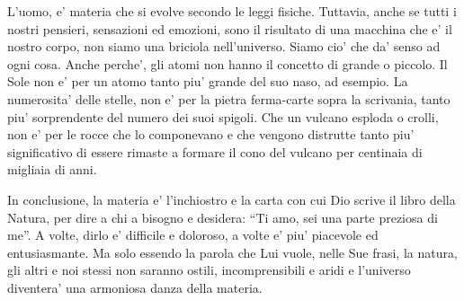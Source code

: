 L'uomo, e' materia che si evolve secondo le leggi fisiche. Tuttavia, anche se tutti i nostri pensieri, sensazioni ed emozioni, sono il risultato di una macchina che e' il nostro corpo, non siamo una briciola nell'universo. Siamo cio' che da' senso ad ogni cosa. Anche perche', gli atomi non hanno il concetto di grande o piccolo. Il Sole non e' per un atomo tanto piu' grande del suo naso, ad esempio. La numerosita' delle stelle, non e' per la pietra ferma-carte sopra la scrivania, tanto piu' sorprendente del numero dei suoi spigoli. Che un vulcano esploda o crolli, non e' per le rocce che lo componevano e che vengono distrutte tanto piu' significativo di essere rimaste a formare il cono del vulcano per centinaia di migliaia di anni.

In conclusione, la materia e' l'inchiostro e la carta con cui Dio scrive il libro della Natura, per dire a chi a bisogno e desidera: ``Ti amo, sei una parte preziosa di me''. A volte, dirlo e' difficile e doloroso, a volte e' piu' piacevole ed entusiasmante. Ma solo essendo la parola che Lui vuole, nelle Sue frasi, la natura, gli altri e noi stessi non saranno ostili, incomprensibili e aridi e l'universo diventera' una armoniosa danza della materia.




